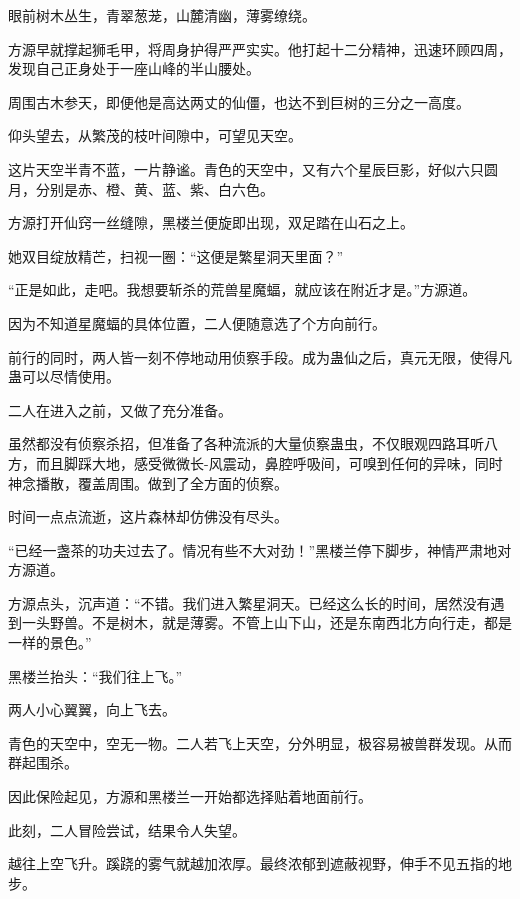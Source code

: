 
\begin{this_body}

眼前树木丛生，青翠葱茏，山麓清幽，薄雾缭绕。

方源早就撑起狮毛甲，将周身护得严严实实。他打起十二分精神，迅速环顾四周，发现自己正身处于一座山峰的半山腰处。

周围古木参天，即便他是高达两丈的仙僵，也达不到巨树的三分之一高度。

仰头望去，从繁茂的枝叶间隙中，可望见天空。

这片天空半青不蓝，一片静谧。青色的天空中，又有六个星辰巨影，好似六只圆月，分别是赤、橙、黄、蓝、紫、白六色。

方源打开仙窍一丝缝隙，黑楼兰便旋即出现，双足踏在山石之上。

她双目绽放精芒，扫视一圈：“这便是繁星洞天里面？”

“正是如此，走吧。我想要斩杀的荒兽星魔蝠，就应该在附近才是。”方源道。

因为不知道星魔蝠的具体位置，二人便随意选了个方向前行。

前行的同时，两人皆一刻不停地动用侦察手段。成为蛊仙之后，真元无限，使得凡蛊可以尽情使用。

二人在进入之前，又做了充分准备。

虽然都没有侦察杀招，但准备了各种流派的大量侦察蛊虫，不仅眼观四路耳听八方，而且脚踩大地，感受微微长-风震动，鼻腔呼吸间，可嗅到任何的异味，同时神念播散，覆盖周围。做到了全方面的侦察。

时间一点点流逝，这片森林却仿佛没有尽头。

“已经一盏茶的功夫过去了。情况有些不大对劲！”黑楼兰停下脚步，神情严肃地对方源道。

方源点头，沉声道：“不错。我们进入繁星洞天。已经这么长的时间，居然没有遇到一头野兽。不是树木，就是薄雾。不管上山下山，还是东南西北方向行走，都是一样的景色。”

黑楼兰抬头：“我们往上飞。”

两人小心翼翼，向上飞去。

青色的天空中，空无一物。二人若飞上天空，分外明显，极容易被兽群发现。从而群起围杀。

因此保险起见，方源和黑楼兰一开始都选择贴着地面前行。

此刻，二人冒险尝试，结果令人失望。

越往上空飞升。蹊跷的雾气就越加浓厚。最终浓郁到遮蔽视野，伸手不见五指的地步。


\end{this_body}
